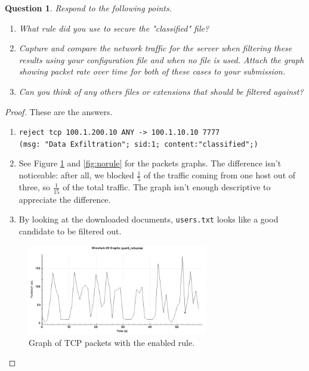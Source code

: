 \documentclass[a4paper,11pt,hidelinks]{article}
\newtheorem{theorem}{Question}[subsection]
\begin{document}
\begin{theorem}
    Respond to the following points.
    \begin{enumerate}
        \item What rule did you use to secure the "classified" file?
        \item Capture and compare the network traffic for the server when filtering these results using your configuration file and when no file is used. Attach the graph showing packet rate over time for both of these cases to your submission.
        \item Can you think of any others files or extensions that should be filtered against?
    \end{enumerate}
\end{theorem}

\begin{proof}
    These are the answers.
    \begin{enumerate}
        \item \texttt{reject tcp 100.1.200.10 ANY -> 100.1.10.10 7777} \\ \texttt{(msg: "Data Exfiltration"; sid:1; content:"classified";)}
        \item See Figure \ref{fig:rule} and \ref{fig:norule} for the packets graphs. The difference isn't noticeable: after all, we blocked $\frac{1}{5}$ of the traffic coming from one host out of three, so $\frac{1}{15}$ of the total traffic. The graph isn't enough descriptive to appreciate the difference.
        \item By looking at the downloaded documents, \verb=users.txt= looks like a good candidate to be filtered out.
    \end{enumerate}
    
    \begin{figure}[ht!]
        \centering
        \includegraphics[width=0.7\textwidth]{../drawable/guard_rule.png}
        \caption{Graph of TCP packets with the enabled rule.}
        \label{fig:rule}
    \end{figure}
    

\end{proof}
\end{document}
